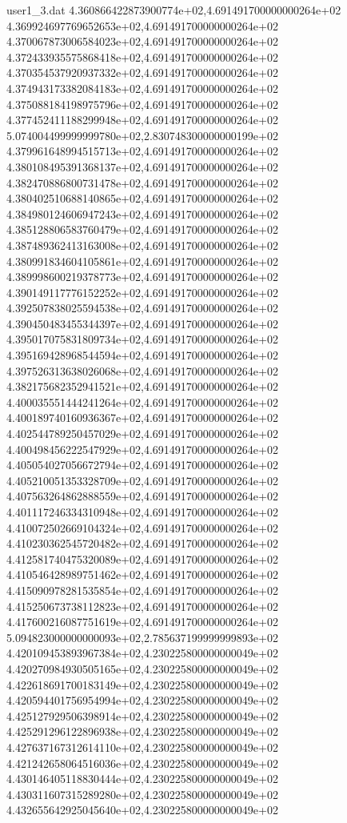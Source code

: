 \begin{filecontents}{user1_3.dat}
4.360866422873900774e+02,4.691491700000000264e+02
4.369924697769652653e+02,4.691491700000000264e+02
4.370067873006584023e+02,4.691491700000000264e+02
4.372433935575868418e+02,4.691491700000000264e+02
4.370354537920937332e+02,4.691491700000000264e+02
4.374943173382084183e+02,4.691491700000000264e+02
4.375088184198975796e+02,4.691491700000000264e+02
4.377452411188299948e+02,4.691491700000000264e+02
5.074004499999999780e+02,2.830748300000000199e+02
4.379961648994515713e+02,4.691491700000000264e+02
4.380108495391368137e+02,4.691491700000000264e+02
4.382470886800731478e+02,4.691491700000000264e+02
4.380402510688140865e+02,4.691491700000000264e+02
4.384980124606947243e+02,4.691491700000000264e+02
4.385128806583760479e+02,4.691491700000000264e+02
4.387489362413163008e+02,4.691491700000000264e+02
4.380991834604105861e+02,4.691491700000000264e+02
4.389998600219378773e+02,4.691491700000000264e+02
4.390149117776152252e+02,4.691491700000000264e+02
4.392507838025594538e+02,4.691491700000000264e+02
4.390450483455344397e+02,4.691491700000000264e+02
4.395017075831809734e+02,4.691491700000000264e+02
4.395169428968544594e+02,4.691491700000000264e+02
4.397526313638026068e+02,4.691491700000000264e+02
4.382175682352941521e+02,4.691491700000000264e+02
4.400035551444241264e+02,4.691491700000000264e+02
4.400189740160936367e+02,4.691491700000000264e+02
4.402544789250457029e+02,4.691491700000000264e+02
4.400498456222547929e+02,4.691491700000000264e+02
4.405054027056672794e+02,4.691491700000000264e+02
4.405210051353328709e+02,4.691491700000000264e+02
4.407563264862888559e+02,4.691491700000000264e+02
4.401117246334310948e+02,4.691491700000000264e+02
4.410072502669104324e+02,4.691491700000000264e+02
4.410230362545720482e+02,4.691491700000000264e+02
4.412581740475320089e+02,4.691491700000000264e+02
4.410546428989751462e+02,4.691491700000000264e+02
4.415090978281535854e+02,4.691491700000000264e+02
4.415250673738112823e+02,4.691491700000000264e+02
4.417600216087751619e+02,4.691491700000000264e+02
5.094823000000000093e+02,2.785637199999999893e+02
4.420109453893967384e+02,4.230225800000000049e+02
4.420270984930505165e+02,4.230225800000000049e+02
4.422618691700183149e+02,4.230225800000000049e+02
4.420594401756954994e+02,4.230225800000000049e+02
4.425127929506398914e+02,4.230225800000000049e+02
4.425291296122896938e+02,4.230225800000000049e+02
4.427637167312614110e+02,4.230225800000000049e+02
4.421242658064516036e+02,4.230225800000000049e+02
4.430146405118830444e+02,4.230225800000000049e+02
4.430311607315289280e+02,4.230225800000000049e+02
4.432655642925045640e+02,4.230225800000000049e+02

\end{filecontents}
